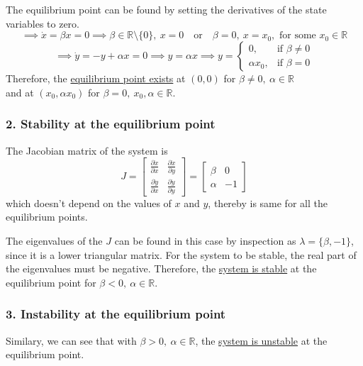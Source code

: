 The equilibrium point can be found by setting the derivatives of the state variables to zero.
\[
    \implies
    \dot{x} = \beta x = 0
    \implies
    \beta \in \mathbb{R}\setminus \{0\}, \ x = 0
    \quad \text{or} \quad
    \beta = 0, \ x = x_0, \text{ for some } x_0 \in \mathbb{R}
\]
\[
    \implies
    \dot{y} = -y + \alpha x = 0
    \implies
    y = \alpha x
    \implies
    y = \begin{cases}
        0,          & \text{if } \beta \neq 0 \\
        \alpha x_0, & \text{if } \beta = 0
    \end{cases}
\]
Therefore, the \underline{equilibrium point exists} at \( \boxed{ (0, 0) } \) for \( \beta \neq 0, \ \alpha \in \mathbb{R} \) \\
and at \( \boxed{ (x_0, \alpha x_0) } \) for \( \beta = 0, \ x_0, \alpha \in \mathbb{R} \).

\vspace*{-1em}
\subsubsection*{2. Stability at the equilibrium point}

The Jacobian matrix of the system is
\[
    J = \begin{bmatrix}
        \frac{\partial \dot{x}}{\partial x} & \frac{\partial \dot{x}}{\partial y} \\
        \frac{\partial \dot{y}}{\partial x} & \frac{\partial \dot{y}}{\partial y}
    \end{bmatrix}
    = \begin{bmatrix}
        \beta  & 0  \\
        \alpha & -1
    \end{bmatrix}
\]
which doesn't depend on the values of \( x \) and \( y \), thereby is same for all the equilibrium points.

The eigenvalues of the \( J \) can be found in this case by inspection as \( \lambda = \{ \beta, -1 \} \), since it is a lower triangular matrix.
For the system to be stable, the real part of the eigenvalues must be negative.
Therefore, the \underline{system is stable} at the equilibrium point for \( \boxed{ \beta < 0, \ \alpha \in \mathbb{R} } \).

\vspace*{-1em}
\subsubsection*{3. Instability at the equilibrium point}

Similary, we can see that with \( \boxed{\beta > 0, \ \alpha \in \mathbb{R}} \), the \underline{system is unstable} at the equilibrium point.
